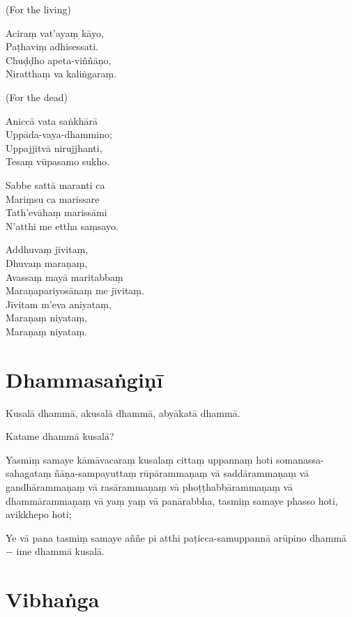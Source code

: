 
(For the living)

Aciraṃ vat'ayaṃ kāyo,\\
Paṭhaviṃ adhisessati.\\
Chuḍḍho apeta-viññāṇo,\\
Niratthaṃ va kaliṅgaraṃ. 

(For the dead)


Aniccā vata saṅkhārā\\
Uppāda-vaya-dhammino;\\
Uppajjitvā nirujjhanti,\\
Tesaṃ vūpasamo sukho. 

Sabbe sattā maranti ca\\
Mariṃsu ca marissare\\
Tath'evāhaṃ marissāmi\\
N'atthi me ettha saṃsayo.


Addhuvaṃ jīvitaṃ,\\
Dhuvaṃ maraṇaṃ,\\
Avassaṃ mayā maritabbaṃ\\
Maraṇapariyosānaṃ me jīvitaṃ.\\
Jīvitam m'eva aniyataṃ,\\
Maraṇaṃ niyataṃ,\\
Maraṇaṃ niyataṃ. 

\section{Dhammasaṅgiṇī}

Kusalā dhammā, akusalā dhammā, abyākatā dhammā.

Katame dhammā kusalā?

Yasmiṃ samaye kāmāvacaraṃ kusalaṃ cittaṃ uppannaṃ hoti somanassa-sahagataṃ
ñāṇa-sampayuttaṃ rūpārammaṇaṃ vā saddārammaṇaṃ vā gandhārammaṇaṃ vā
rasārammaṇaṃ vā phoṭṭhabbārammaṇaṃ vā dhammārammaṇaṃ vā yaṃ yaṃ vā panārabbha,
tasmiṃ samaye phasso hoti, avikkhepo hoti;

Ye vā pana tasmiṃ samaye aññe pi atthi paṭicca-samuppannā arūpino dhammā − ime
dhammā kusalā.


\section{Vibhaṅga}

